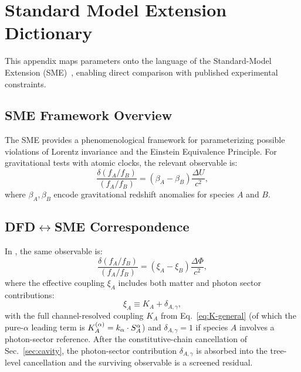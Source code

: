 
\section{Standard Model Extension Dictionary}\label{app:sme}

This appendix maps \DFD parameters onto the language of the Standard-Model 
Extension (SME)~\cite{Kostelecky2011}, enabling direct comparison with 
published experimental constraints.

\subsection{SME Framework Overview}\label{app:sme-overview}

The SME provides a phenomenological framework for parameterizing possible 
violations of Lorentz invariance and the Einstein Equivalence Principle. 
For gravitational tests with atomic clocks, the relevant observable is:
\begin{equation}\label{eq:sme-observable}
\frac{\delta(f_A/f_B)}{(f_A/f_B)} = (\beta_A - \beta_B)\frac{\Delta U}{c^2},
\end{equation}
where $\beta_A, \beta_B$ encode gravitational redshift anomalies for species $A$ and $B$.

\subsection{DFD$\leftrightarrow$SME Correspondence}\label{app:sme-mapping}

In \DFD, the same observable is:
\begin{equation}\label{eq:dfd-clock-obs}
\frac{\delta(f_A/f_B)}{(f_A/f_B)} = (\xi_A - \xi_B)\frac{\Delta\Phi}{c^2},
\end{equation}
where the effective coupling $\xi_A$ includes both matter and photon sector contributions:
\begin{equation}\label{eq:xi-def}
\xi_A \equiv K_A + \delta_{A,\gamma},
\end{equation}
with the full channel-resolved coupling $K_A$ from Eq.~\eqref{eq:K-general} (of which the pure-$\alpha$ leading term is $K_A^{(\alpha)} = k_\alpha \cdot S_A^\alpha$) and 
$\delta_{A,\gamma} = 1$ if species $A$ involves a photon-sector reference.
After the constitutive-chain cancellation of Sec.~\ref{sec:cavity}, the photon-sector contribution $\delta_{A,\gamma}$ is absorbed into the tree-level cancellation and the surviving observable is a screened residual.

